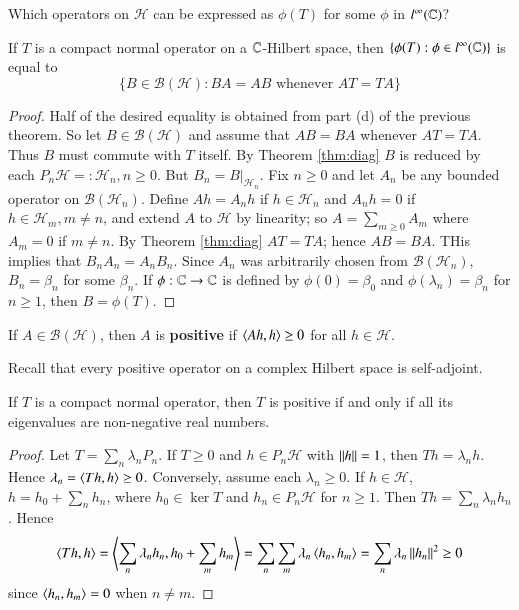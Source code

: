 \begin{qst}
    Which operators on $\mathscr{H}$ can be expressed as $\phi(T)$ for some $\phi$ in $l^{\infty}(\mathbb C)$?
\end{qst}

\begin{thm}
    If $T$ is a compact normal operator on a $\mathbb C$-Hilbert space, then $\{\phi(T):\phi \in l^{\infty}(\mathbb C)\}$ is equal to $$\{B \in \mathscr{B}(\mathscr{H}):BA = AB\text{ whenever }AT =TA\}$$
\end{thm}
\begin{proof}
    Half of the desired equality is obtained from part (d) of the previous theorem. So let $B \in \mathscr{B}(\mathscr{H})$ and assume that $AB = BA$ whenever $AT = TA$. Thus $B$ must commute with $T$ itself. By Theorem \ref{thm:diag} $B$ is reduced by each $P_n\mathscr{H} =: \mathscr{H}_n, n \geq 0$. But $B_n = B\vert_{\mathscr{H}_n}$. Fix $n \geq 0$ and let $A_n$ be any bounded operator on $\mathscr{B}(\mathscr{H}_n)$. Define $Ah = A_nh$ if $h \in \mathscr{H}_n$ and $A_nh = 0$ if $h \in \mathscr{H}_m, m\neq n$, and extend $A$ to $\mathscr{H}$ by linearity; so $A = \sum_{m\geq 0}A_m$ where $A_m = 0$ if $m \neq n$. By Theorem \ref{thm:diag} $AT =TA$; hence $AB  = BA$. THis implies that $B_nA_n = A_nB_n$. Since $A_n$ was arbitrarily chosen from $\mathscr{B}(\mathscr{H}_n)$, $B_n = \beta_n$ for some $\beta_n$. If $\phi:\mathbb C\rightarrow \mathbb C$ is defined by $\phi(0) = \beta_0$ and $\phi(\lambda_n) = \beta_n$ for $n \geq 1$, then $B = \phi(T)$.
\end{proof}

\begin{defn}
    If $A \in \mathscr{B}(\mathscr{H})$, then $A$ is \textbf{positive} if $\left\langle Ah,h\right\rangle \geq 0$ for all $h \in \mathscr{H}$.
\end{defn}

Recall that every positive operator on a complex Hilbert space is self-adjoint.

\begin{prop}
    If $T$ is a compact normal operator, then $T$ is positive if and only if all its eigenvalues are non-negative real numbers.
\end{prop}
\begin{proof}
    Let $T = \sum_n\lambda_nP_n$. If $T \geq 0$ and $h \in P_n\mathscr{H}$ with $\left|\left| h\right|\right| = 1$, then $Th = \lambda_nh$. Hence $\lambda_n = \left\langle Th,h\right\rangle \geq 0$. Conversely, assume each $\lambda_n \geq 0$. If $h \in \mathscr{H}$, $h = h_0 + \sum_nh_n$, where $h_0 \in \ker T$ and $h_n \in P_n\mathscr{H}$ for $n \geq 1$. Then $Th = \sum_n\lambda_nh_n$. Hence $$\left\langle Th,h\right\rangle = \left\langle\sum_n\lambda_nh_n,h_0+\sum_mh_m\right\rangle = \sum_n\sum_m\lambda_n\left\langle h_n,h_m\right\rangle = \sum_n\lambda_n\left|\left| h_n\right|\right|^2\geq 0$$
    since $\left\langle h_n,h_m\right\rangle = 0$ when $n \neq m$.
\end{proof}

